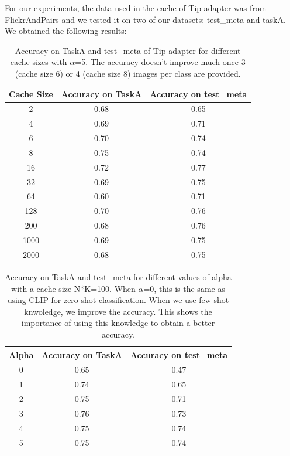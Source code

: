 \documentclass[12pt,a4paper]{article}
\begin{document}
For our experiments, the data used in the cache of Tip-adapter was from FlickrAndPairs and we tested it on two of our datasets: test\_meta and taskA. We obtained the following results:
\begin{table}[H]
    \centering
    \begin{tabular}{|c|c|c|}
    \hline
    \textbf{Cache Size} & \textbf{Accuracy on TaskA} & \textbf{Accuracy on test\_meta} \\ \hline
    2    & 0.68 & 0.65 \\ \hline
    4    & 0.69 & 0.71 \\ \hline
    6    & 0.70 & 0.74 \\ \hline
    8    & 0.75 & 0.74 \\ \hline
    16   & 0.72 & 0.77 \\ \hline
    32   & 0.69 & 0.75 \\ \hline
    64   & 0.60 & 0.71 \\ \hline
    128  & 0.70 & 0.76 \\ \hline
    200  & 0.68 & 0.76 \\ \hline
    1000 & 0.69 & 0.75 \\ \hline
    2000 & 0.68 & 0.75 \\ \hline
    \end{tabular}
    \caption{Accuracy on TaskA and test\_meta of Tip-adapter for different cache sizes with $\alpha$=5. The accuracy doesn't improve much once 3 (cache size 6) or 4 (cache size 8) images per class are provided.}
    \label{tab:cache}
\end{table}

\begin{table}[H]
    \centering
    \begin{tabular}{|c|c|c|}
    \hline
    \textbf{Alpha} & \textbf{Accuracy on TaskA} & \textbf{Accuracy on test\_meta} \\ \hline
    0 & 0.65 & 0.47 \\ \hline
    1 & 0.74 & 0.65 \\ \hline
    2 & 0.75 & 0.71 \\ \hline
    3 & 0.76 & 0.73 \\ \hline
    4 & 0.75 & 0.74 \\ \hline
    5 & 0.75 & 0.74 \\ \hline
    \end{tabular}
    \caption{Accuracy on TaskA and test\_meta for different values of alpha with a cache size N*K=100. When $\alpha$=0, this is the same as using CLIP for zero-shot classification. When we use few-shot knwoledge, we improve the accuracy. This shows the importance of using this knowledge to obtain a better accuracy.}
    \label{tab:alpha}
\end{table}
\end{document}
